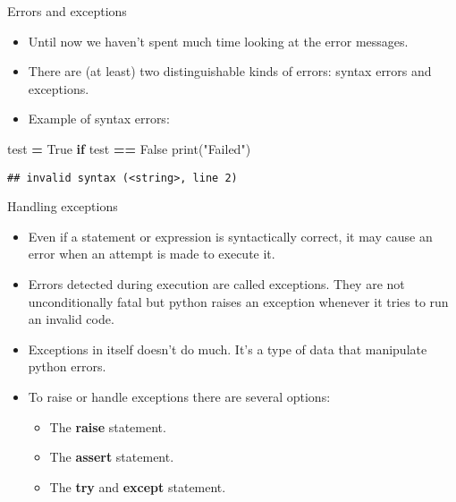 \documentclass[
  8pt,
  ignorenonframetext,
]{beamer}
\newenvironment{Shaded}{\begin{snugshade}}{\end{snugshade}}
\newcommand{\BuiltInTok}[1]{#1}
\newcommand{\ControlFlowTok}[1]{\textcolor[rgb]{0.13,0.29,0.53}{\textbf{#1}}}
\newcommand{\NormalTok}[1]{#1}
\newcommand{\OperatorTok}[1]{\textcolor[rgb]{0.81,0.36,0.00}{\textbf{#1}}}
\newcommand{\StringTok}[1]{\textcolor[rgb]{0.31,0.60,0.02}{#1}}
\newcommand{\VariableTok}[1]{\textcolor[rgb]{0.00,0.00,0.00}{#1}}
\providecommand{\tightlist}{%
  \setlength{\itemsep}{0pt}\setlength{\parskip}{0pt}}
\begin{document}
\begin{frame}[fragile]{Errors and exceptions}
\protect\hypertarget{errors-and-exceptions}{}
\begin{itemize}
\item
  Until now we haven't spent much time looking at the error messages.
\item
  There are (at least) two distinguishable kinds of errors: syntax
  errors and exceptions.
\item
  Example of syntax errors:
\end{itemize}

\begin{Shaded}
\begin{Highlighting}[]
\NormalTok{test }\OperatorTok{=} \VariableTok{True}
\ControlFlowTok{if}\NormalTok{ test }\OperatorTok{==} \VariableTok{False}
  \BuiltInTok{print}\NormalTok{(}\StringTok{"Failed"}\NormalTok{)}
\end{Highlighting}
\end{Shaded}

\begin{verbatim}
## invalid syntax (<string>, line 2)
\end{verbatim}
\end{frame}

\begin{frame}{Handling exceptions}
\protect\hypertarget{handling-exceptions}{}
\begin{itemize}
\item
  Even if a statement or expression is syntactically correct, it may
  cause an error when an attempt is made to execute it.
\item
  Errors detected during execution are called exceptions. They are not
  unconditionally fatal but python raises an exception whenever it tries
  to run an invalid code.
\item
  Exceptions in itself doesn't do much. It's a type of data that
  manipulate python errors.
\item
  To raise or handle exceptions there are several options:

  \begin{itemize}
  \tightlist
  \item
    The \textbf{raise} statement.
  \item
    The \textbf{assert} statement.
  \item
    The \textbf{try} and \textbf{except} statement.
  \end{itemize}
\end{itemize}
\end{frame}
\end{document}
